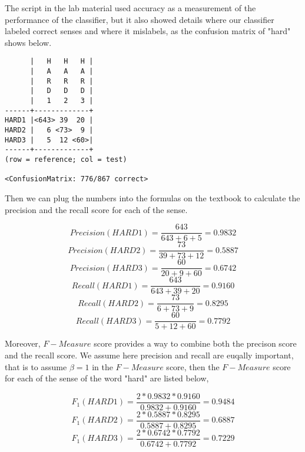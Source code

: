 \documentclass[11pt]{article} %
\begin{document}
The script in the lab material used accuracy as a measurement of the performance of the classifier, but it also showed details where our classifier labeled correct senses and where it mislabels, as the confusion matrix of "hard" shows below.

\begin{lstlisting}
      |   H   H   H |
      |   A   A   A |
      |   R   R   R |
      |   D   D   D |
      |   1   2   3 |
------+-------------+
HARD1 |<643> 39  20 |
HARD2 |   6 <73>  9 |
HARD3 |   5  12 <60>|
------+-------------+
(row = reference; col = test)

<ConfusionMatrix: 776/867 correct>
\end{lstlisting}

Then we can plug the numbers into the formulas on the textbook\cite[455]{JurafskyMartin200805} to calculate the precision and the recall score for each of the sense.

\begin{equation}
    Precision(HARD1)=\frac{643}{643+6+5}=0.9832
\end{equation}
\begin{equation}
    Precision(HARD2)=\frac{73}{39+73+12}=0.5887
\end{equation}
\begin{equation}
    Precision(HARD3)=\frac{60}{20+9+60}=0.6742
\end{equation}
\begin{equation}
    Recall(HARD1)=\frac{643}{643+39+20}=0.9160
\end{equation}
\begin{equation}
    Recall(HARD2)=\frac{73}{6+73+9}=0.8295
\end{equation}
\begin{equation}
    Recall(HARD3)=\frac{60}{5+12+60}=0.7792
\end{equation}

Moreover, $F-Measure$ score provides a way to combine both the precison score and the recall score. We assume here precision and recall are euqally important, that is to assume $\beta=1$ in the $F-Measure$ score, then the $F-Measure$ score for each of the sense of the word "hard" are listed below,

\begin{equation}
    F_1(HARD1)=\frac{2*0.9832*0.9160}{0.9832+0.9160}=0.9484
\end{equation}
\begin{equation}
    F_1(HARD2)=\frac{2*0.5887*0.8295}{0.5887+0.8295}=0.6887
\end{equation}
\begin{equation}
    F_1(HARD3)=\frac{2*0.6742*0.7792}{0.6742+0.7792}=0.7229
\end{equation}
\end{document}
